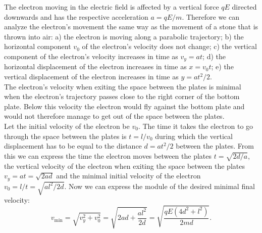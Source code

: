 \solueng
The electron moving in the electric field is affected by a vertical force $qE$ directed downwards and has the respective acceleration $a=qE/m$. Therefore we can analyze the electron’s movement the same way as the movement of a stone that is thrown into air: a) the electron is moving along a parabolic trajectory; b) the horizontal component $v_0$ of the electron’s velocity does not change; c) the vertical component of the electron’s velocity increases in time as $v_y=at$; d) the horizontal displacement of the electron increases in time as $x=v_0t$; e) the vertical displacement of the electron increases in time as $y=at^2/2$.\\
The electron’s velocity when exiting the space between the plates is minimal when the electron’s trajectory passes close to the right corner of the bottom plate. Below this velocity the electron would fly against the bottom plate and would not therefore manage to get out of the space between the plates.\\
Let the initial velocity of the electron be $v_0$. The time it takes the electron to go through the space between the plates is $t=l/v_0$ during which the vertical displacement has to be equal to the distance $d=at^2/2$ between the plates. From this we can express the time the electron moves between the plates $t=\sqrt{2d/a}$, the vertical velocity of the electron when exiting the space between the plates $v_y=at=\sqrt{2ad}$ and the minimal initial velocity of the electron $v_0=l/t=\sqrt{al^2/2d}$. Now we can express the module of the desired minimal final velocity:
\[
v_\mathrm{min}=\sqrt{v_y^2+v_0^2}=\sqrt{2ad+\frac{al^2}{2d}}=\sqrt{\frac{qE\left(4d^2+l^2\right)}{2md}}.
\]
\probend